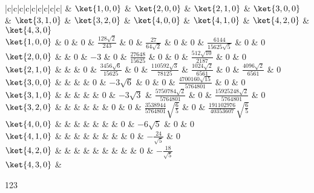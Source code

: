 

\begin{table}[ht]
\centering
\caption{$\mel{\psi_{n',l',m'}}{z}{\psi_{n,l,m}}$}\label{HDipM_tab1}
\begin{tabular}{|c|c|c|c|c|c|c|c|c|}
\hline
& $\ket{1,0,0}$ & $\ket{2,0,0}$ & $\ket{2,1,0}$ & $\ket{3,0,0}$ & $\ket{3,1,0}$ & $\ket{3,2,0}$ & $\ket{4,0,0}$ &  $\ket{4,1,0}$ & $\ket{4,2,0}$ & $\ket{4,3,0}$ \\
\hline
$\ket{1,0,0}$ & 0 & 0 & $\frac{128\sqrt 2}{243}$ & 0 & $\frac{27}{64\sqrt 2}$ & 0 & 0 & $\frac{6144}{15625 \sqrt 5}$ & 0 & 0\\
\hline
$\ket{2,0,0}$ &  & 0 & $-3$ & 0 & $\frac{27648}{15625}$ & 0 & 0 & $\frac{512\sqrt{10}}{2187}$ & 0 & 0 \\
\hline
$\ket{2,1,0}$ &  &  & 0 & $\frac{3456\sqrt 6}{15625}$ & 0 & $\frac{110592\sqrt 3}{78125}$ & $\frac{1024\sqrt 2}{6561}$ & 0 & $\frac{4096\sqrt 2}{6561}$ & 0\\
\hline
$\ket{3,0,0}$ &  &  &  & 0 & $-3\sqrt 6$ & 0 & 0 & $\frac{4700160 \sqrt{15}}{5764801}$ & 0 & 0\\
\hline
$\ket{3,1,0}$ &  &  &  & & 0 & $-3 \sqrt 3$ & $\frac{5750784 \sqrt 2}{5764801}$ & 0 & $\frac{15925248 \sqrt 2}{5764801}$ & 0\\
\hline
$\ket{3,2,0}$ &  &  &  &  &  & 0 & 0 & $\frac{3538944}{5764801}\sqrt{\frac 65}$ & 0 & $\frac{191102976}{40353607}\sqrt{\frac 65}$ \\
\hline
$\ket{4,0,0}$ &  &  &  &  &  &  & 0 & $-6\sqrt 5$ & 0 & 0 \\
\hline
$\ket{4,1,0}$ &  &  &  &  &  &  &  & 0 & $-\frac{24}{\sqrt 5}$ & 0\\
\hline
$\ket{4,2,0}$ &  &  &  &  &  &  &  &  & 0 & $-\frac{18}{\sqrt 5}$ \\
\hline
$\ket{4,3,0}$ & \\
\hline
\end{tabular}
\end{table}

123